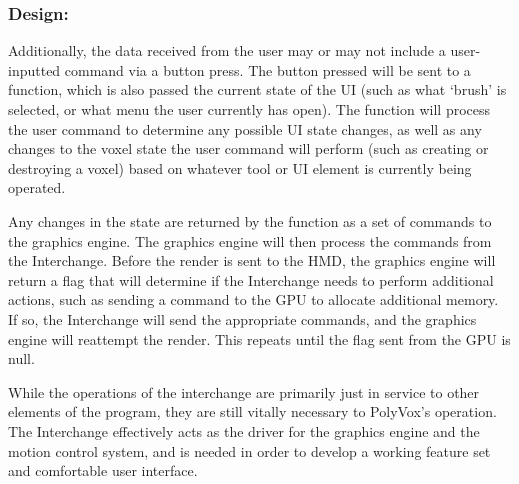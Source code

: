 \documentclass[onecolumn, draftclsnofoot,10pt, compsoc]{IEEEtran}
\begin{document}
\subsubsection{Design:}
Additionally, the data received from the user may or may not include a user-inputted command via a button press. The button pressed will be sent to a function, which is also passed the current state of the UI (such as what ‘brush’ is selected, or what menu the user currently has open). The function will process the user command to determine any possible UI state changes, as well as any changes to the voxel state the user command will perform (such as creating or destroying a voxel) based on whatever tool or UI element is currently being operated. 

Any changes in the state are returned by the function as a set of commands to the graphics engine. The graphics engine will then process the commands from the Interchange. Before the render is sent to the HMD, the graphics engine will return a flag that will determine if the Interchange needs to perform additional actions, such as sending a command to the GPU to allocate additional memory. If so, the Interchange will send the appropriate commands, and the graphics engine will reattempt the render. This repeats until the flag sent from the GPU is null. 

While the operations of the interchange are primarily just in service to other elements of the program, they are still vitally necessary to PolyVox’s operation. The Interchange effectively acts as the driver for the graphics engine and the motion control system, and is needed in order to develop a working feature set and comfortable user interface.
\end{document}
